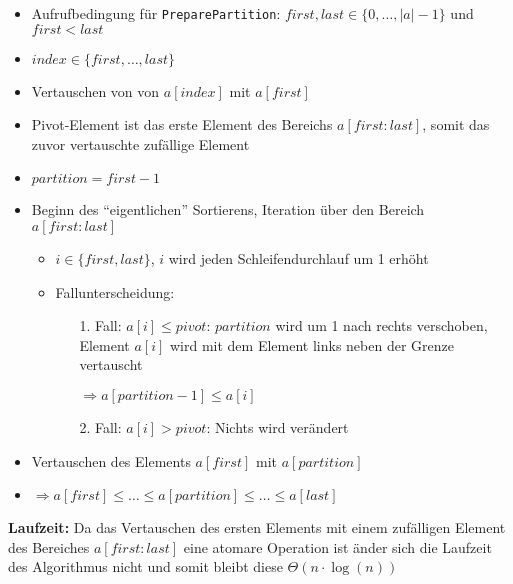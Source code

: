 \begin{itemize}[nolistsep, noitemsep]
    \item Aufrufbedingung für \texttt{PreparePartition}: $first, last \in \{0, \dots, |a| - 1\}$ und $first < last$
    \item $index \in \{first, \dots, last\}$ 
    \item Vertauschen von von $a[index]$ mit $a[first]$
    \item Pivot-Element ist das erste Element des Bereichs $a[first:last]$, somit das zuvor vertauschte zufällige Element
    \item $partition = first - 1$
    \item Beginn des \enquote{eigentlichen} Sortierens, Iteration über den Bereich $a[first:last]$
    \item[] \begin{itemize}[nolistsep, noitemsep]
    	\item $i \in \{first, last\}$, $i$ wird jeden Schleifendurchlauf um 1 erhöht
        \item Fallunterscheidung: 
        \item[] \begin{itemize}[nolistsep, noitemsep]
        	\item[1. Fall:] $a[i] \leq pivot$: $partition$ wird um 1 nach rechts verschoben, Element $a[i]$ wird mit dem Element links neben der Grenze vertauscht
            \item[] $\Rightarrow a[partition - 1] \leq a[i]$
            \item[2. Fall:] $a[i] > pivot$: Nichts wird verändert
        \end{itemize}
    \end{itemize}
    \item Vertauschen des Elements $a[first]$ mit $a[partition]$
    \item $\Rightarrow a[first] \leq \dots \leq a[partition] \leq \dots \leq a[last]$
\end{itemize}

\nuffsaid


\textbf{Laufzeit: } Da das Vertauschen des ersten Elements mit einem zufälligen Element des Bereiches $a[first:last]$ eine atomare Operation ist änder sich die Laufzeit des Algorithmus nicht und somit bleibt diese $\Theta(n \cdot \log(n))$